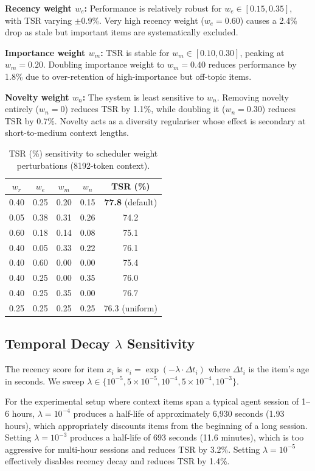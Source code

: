 \textbf{Recency weight $w_e$:}  Performance is relatively robust for
$w_e \in [0.15, 0.35]$, with TSR varying $\pm 0.9$\%.  Very high recency
weight ($w_e = 0.60$) causes a 2.4\% drop as stale but important items are
systematically excluded.

\textbf{Importance weight $w_m$:}  TSR is stable for $w_m \in [0.10, 0.30]$,
peaking at $w_m = 0.20$.  Doubling importance weight to $w_m = 0.40$ reduces
performance by 1.8\% due to over-retention of high-importance but off-topic
items.

\textbf{Novelty weight $w_n$:}  The system is least sensitive to $w_n$.
Removing novelty entirely ($w_n = 0$) reduces TSR by 1.1\%, while doubling it
($w_n = 0.30$) reduces TSR by 0.7\%.  Novelty acts as a diversity regulariser
whose effect is secondary at short-to-medium context lengths.

\begin{table}[h!]
\centering
\caption{TSR (\%) sensitivity to scheduler weight perturbations (8192-token context).}
\label{tab:app_weight_sensitivity}
\begin{tabular}{@{}ccccc@{}}
\toprule
$w_r$ & $w_e$ & $w_m$ & $w_n$ & \textbf{TSR (\%)} \\
\midrule
0.40 & 0.25 & 0.20 & 0.15 & \textbf{77.8} (default) \\
0.05 & 0.38 & 0.31 & 0.26 & 74.2 \\
0.60 & 0.18 & 0.14 & 0.08 & 75.1 \\
0.40 & 0.05 & 0.33 & 0.22 & 76.1 \\
0.40 & 0.60 & 0.00 & 0.00 & 75.4 \\
0.40 & 0.25 & 0.00 & 0.35 & 76.0 \\
0.40 & 0.25 & 0.35 & 0.00 & 76.7 \\
0.25 & 0.25 & 0.25 & 0.25 & 76.3 (uniform) \\
\bottomrule
\end{tabular}
\end{table}

\subsection{Temporal Decay $\lambda$ Sensitivity}

The recency score for item $x_i$ is $e_i = \exp(-\lambda \cdot \Delta t_i)$
where $\Delta t_i$ is the item's age in seconds.  We sweep
$\lambda \in \{10^{-5}, 5 \times 10^{-5}, 10^{-4}, 5 \times 10^{-4}, 10^{-3}\}$.

For the experimental setup where context items span a typical agent session of
1--6 hours, $\lambda = 10^{-4}$ produces a half-life of approximately
6{,}930 seconds (1.93 hours), which appropriately discounts items from the
beginning of a long session.  Setting $\lambda = 10^{-3}$ produces a
half-life of 693 seconds (11.6 minutes), which is too aggressive for multi-hour
sessions and reduces TSR by 3.2\%.  Setting $\lambda = 10^{-5}$ effectively
disables recency decay and reduces TSR by 1.4\%.

